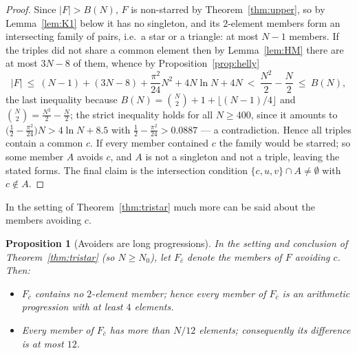 \documentclass[11pt]{article}
\newtheorem{proposition}[theorem]{Proposition}
\theoremstyle{definition}
\begin{document}
\begin{proof}
Since $|F|>B(N)$, $F$ is non-starred by Theorem~\ref{thm:upper}, so by Lemma~\ref{lem:K1} below it has no singleton, and its $2$-element members form an intersecting family of pairs, i.e.\ a star or a triangle: at most $N-1$ members. If the triples did not share a common element then by Lemma~\ref{lem:HM} there are at most $3N-8$ of them, whence by Proposition~\ref{prop:helly}
\[ |F|\ \le\ (N-1)+(3N-8)+\frac{\pi^2}{24}N^2+4N\ln N+4N\ <\ \frac{N^2}{2}-\frac{N}{2}\ \le\ B(N), \]
the last inequality because $B(N)=\binom N2+1+\lfloor(N-1)/4\rfloor$ and $\binom N2=\frac{N^2}2-\frac N2$; the strict inequality holds for all $N\ge400$, since it amounts to $\bigl(\frac12-\frac{\pi^2}{24}\bigr)N>4\ln N+8.5$ with $\frac12-\frac{\pi^2}{24}>0.0887$ --- a contradiction. Hence all triples contain a common $c$. If every member contained $c$ the family would be starred; so some member $A$ avoids $c$, and $A$ is not a singleton and not a triple, leaving the stated forms. The final claim is the intersection condition $\{c,u,v\}\cap A\neq\emptyset$ with $c\notin A$.
\end{proof}

In the setting of Theorem~\ref{thm:tristar} much more can be said about the members avoiding $c$.

\begin{proposition}[Avoiders are long progressions]\label{prop:long}
In the setting and conclusion of Theorem~\ref{thm:tristar} (so $N\ge N_0$), let $F_{\bar c}$ denote the members of $F$ avoiding $c$. Then:
\begin{itemize}
\item[(i)] $F_{\bar c}$ contains no $2$-element member; hence every member of $F_{\bar c}$ is an arithmetic progression with at least $4$ elements.
\item[(ii)] Every member of $F_{\bar c}$ has more than $N/12$ elements; consequently its difference is at most $12$.
\end{itemize}
\end{proposition}
\end{document}
